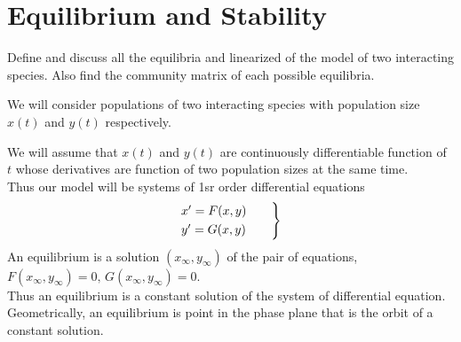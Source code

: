 \documentclass[../main-sheet.tex]{subfiles}
\begin{document}
\chapter{Equilibrium and Stability}
\begin{prob}
    Define and discuss all the equilibria and linearized of the model of two interacting species. Also find the community matrix of each possible equilibria.
\end{prob}
\begin{soln}
    We will consider populations of two interacting species with population size \(x(t)\) and \(y(t)\) respectively.

    We will assume that \(x(t)\) and \(y(t)\) are continuously differentiable function of \(t\) whose derivatives are function of two population sizes at the same time.\\
    Thus our model will be systems of 1sr order differential equations
    \begin{equation}
        \begin{rcases}
            x'=F(x,y)\qquad\\
            y'=G(x,y)\qquad
        \end{rcases}
        \label{eq:sh2.1.1}
    \end{equation}
    An equilibrium is a solution \((x_\infty, y_\infty)\) of the pair of equations, \(F(x_\infty, y_\infty)=0,\,G(x_\infty, y_\infty)=0\).\\
    Thus an equilibrium is a constant solution of the system of differential equation. Geometrically, an equilibrium is point in the phase plane that is the orbit of a constant solution.
    

\end{soln}
\end{document}
